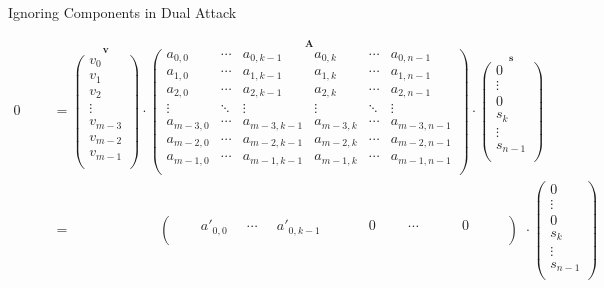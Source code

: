\documentclass[presentation,smaller]{beamer}
\renewcommand{\vec}[1]{\ensuremath{\mathbf{#1}}\xspace}
\begin{document}
\begin{frame}[label={sec:orgheadline52}]{Ignoring Components in Dual Attack}
\begin{center}
\scriptsize
\begin{align*}
0 \phantom{xxi} &= \overset{\vec{v}}{\begin{pmatrix}
v_0\\
v_1\\
v_2\\
\vdots\\
v_{m-3}\\
v_{m-2}\\
v_{m-1}\\
\end{pmatrix}} \cdot 
\overset{\vec{A}}{
\left(\begin{array}{ccc|ccc} 
a_{0,0} & \cdots & a_{0,k-1} & a_{0,k} & \cdots & a_{0,n-1}\\
a_{1,0} & \cdots & a_{1,k-1} & a_{1,k} & \cdots & a_{1,n-1}\\
a_{2,0} & \cdots & a_{2,k-1} & a_{2,k} & \cdots & a_{2,n-1}\\
\vdots  & \ddots & \vdots & \vdots & \ddots & \vdots\\
a_{m-3,0} & \cdots & a_{m-3,k-1} & a_{m-3,k} & \cdots & a_{m-3,n-1}\\
a_{m-2,0} & \cdots & a_{m-2,k-1} & a_{m-2,k} & \cdots & a_{m-2,n-1}\\
a_{m-1,0} & \cdots & a_{m-1,k-1} & a_{m-1,k} & \cdots & a_{m-1,n-1}\\
\end{array}\right)} \cdot 
\overset{\vec{s}}{\begin{pmatrix}0\\ \vdots\\ 0\\ \hline s_k\\ \vdots\\ s_{n-1}\\ \end{pmatrix}}\\
&= \phantom{\begin{pmatrix}v_m-3\end{pmatrix} \cdot\ } \left(\begin{array}{ccc|ccc} 
\phantom{xxx} a'_{0,0} \phantom{x} & \cdots & \phantom{x} a'_{0,k-1} \phantom{xi} & \phantom{xxx} 0 \phantom{xxi} & \cdots & \phantom{xxxx} 0 \phantom{xxxx}\\
\end{array}\right) \phantom{i} \cdot {\begin{pmatrix}0\\ \vdots\\ 0\\ \hline s_k\\ \vdots\\ s_{n-1}\\ \end{pmatrix}}\\
\end{align*}
\end{center}
\end{frame}
\end{document}
